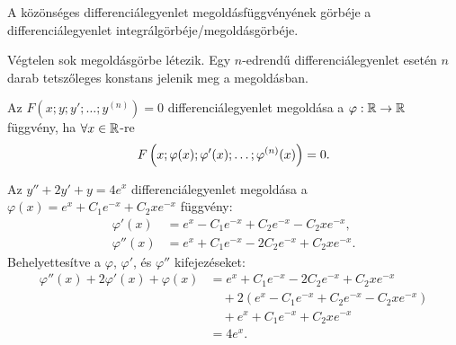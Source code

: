 \documentclass{szb-practice}
\begin{document}

\begin{definition}[Megoldásgörbe]
  A közönséges differenciálegyenlet megoldásfüggvényének görbéje a
  differenciálegyenlet integrálgörbéje/megoldásgörbéje.
\end{definition}

\begin{note}
  Végtelen sok megoldásgörbe létezik. Egy $n$-edrendű differenciálegyenlet
  esetén $n$ darab tetszőleges konstans jelenik meg a megoldásban.
\end{note}

\begin{definition}
  Az $F \left( x ; y ; y' ; \dots ; y^{(n)} \right) = 0$ differenciálegyenlet
  megoldása a $\varphi : \mathbb{R} \rightarrow \mathbb{R}$ függvény, ha
  $\forall x \in \mathbb{R}$-re
  $$
    F \left( x ; \varphi(x) ; \varphi'(x) ; \dots ; \varphi^{(n)}(x) \right) = 0
    \text.
  $$
\end{definition}

\begin{example}[][nobreak]
  Az $y'' + 2y' + y = 4e^x$ differenciálegyenlet megoldása a
  $\varphi(x) = e^x + C_1 e^{-x} + C_2 x e^{-x}$ függvény:
  \begin{align*}
    \varphi'(x)  & = e^x - C_1 e^{-x} + C_2 e^{-x} - C_2 x e^{-x},  \\
    \varphi''(x) & = e^x + C_1 e^{-x} - 2C_2 e^{-x} + C_2 x e^{-x}.
  \end{align*}
  Behelyettesítve a $\varphi$, $\varphi'$, és $\varphi''$ kifejezéseket:
  \begin{align*}
    \varphi''(x) + 2\varphi'(x) + \varphi(x)
     & = e^x + C_1 e^{-x} - 2C_2 e^{-x} + C_2 x e^{-x}
    \\
     & \quad + 2 \left( e^x - C_1 e^{-x} + C_2 e^{-x} - C_2 x e^{-x} \right)
    \\
     & \quad + e^x + C_1 e^{-x} + C_2 x e^{-x}
    \\
     & = 4e^x.
  \end{align*}
\end{example}
\end{document}
